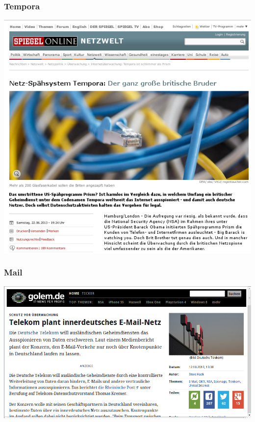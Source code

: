 \documentclass[12pt]{beamer}
\begin{document}
\begin{frame}
    \frametitle{Tempora}
    \includegraphics[height=0.7\textheight]{img/spiegel-tempora.png}
\end{frame}

\begin{frame}
    \frametitle{Mail}
    \includegraphics[height=0.7\textheight]{img/telekom_mail.png}
\end{frame}
\end{document}
